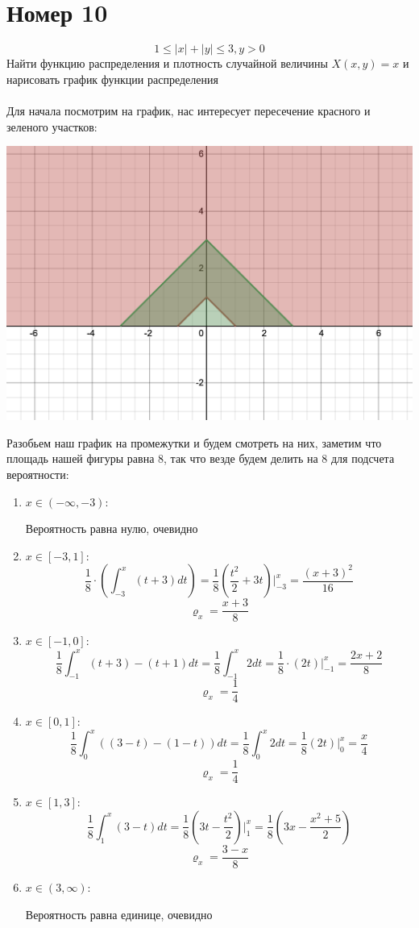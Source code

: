 \documentclass[a4paper,12pt]{article}
\begin{document}
\section*{Номер 10}
\[
1 \leq |x| + |y| \leq 3, y > 0
\]
Найти функцию распределения и плотность случайной величины $X(x, y) = x$ и нарисовать график функции распределения
\\\\
Для начала посмотрим на график, нас интересует пересечение красного и зеленого участков:
\begin{center}
\includegraphics[scale=0.6]{2.png}
\end{center}
Разобьем наш график на промежутки и будем смотреть на них, заметим что площадь нашей фигуры равна 8, так что везде будем делить на $8$ для подсчета вероятности:
\begin{enumerate}
\item $x \in (-\infty, -3)$:

Вероятность равна нулю, очевидно
\item $x \in [-3, 1]$:
\[
\frac{1}{8} \cdot \left(\int_{-3}^x (t+3)dt \right) = \frac{1}{8} \left(\frac{t^2}{2} + 3t\right) \Bigg|^x_{-3} =  \frac{(x+3)^2}{16}
\]
\[
\varrho_x = \frac{x+3}{8}
\]
\item  $x \in [-1, 0]$:
\[
\frac18 \int_{-1}^{x} (t + 3) - (t+ 1)dt = \frac{1}{8} \int_{-1}^{x} 2dt = \frac{1}{8} \cdot (2t) \Bigg|^x_{-1} = \frac{2x+2}{8}
\]
\[
\varrho_x = \frac{1}{4}
\]
\item $x \in [0, 1]$:
\[ \frac{1}{8} \int_0^x ((3 - t) - (1 - t)) dt = \frac18 \int_0^x 2dt = \frac18 (2t) \Bigg|^x_0  = \frac{x}{4}
\]
\[
\varrho_x = \frac{1}{4}
\]
\item $x \in [1, 3]$:
\[
 \frac18 \int_1^x (3-t)dt = \frac18 (3t-\frac{t^2}{2})\Bigg|^x_1 = \frac18 \left(3x - \frac{x^2+5}{2}\right)
\]
\[
\varrho_x = \frac{3-x}{8}
\]
\item $x \in (3, \infty)$:

Вероятность равна единице, очевидно
\end{enumerate}
\end{document}
